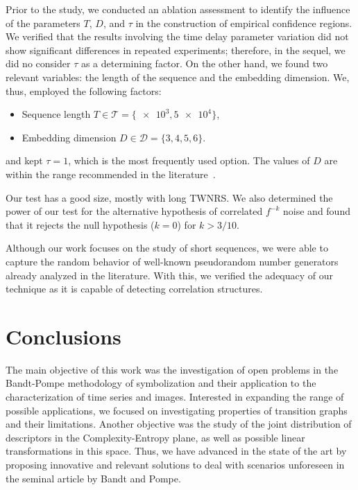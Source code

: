 \documentclass[a4,11pt]{pssbmac}
\begin{document}
Prior to the study, we conducted an ablation assessment to identify the influence of the parameters $T$, $D$, and $\tau$ in the construction of empirical confidence regions.
We verified that the results involving the time delay parameter variation did not show significant differences in repeated experiments; therefore, in the sequel, we did no consider $\tau$ as a determining factor.
On the other hand, we found two relevant variables: the length of the sequence and the embedding dimension.
We, thus, employed the following factors:
\begin{itemize}
	\item Sequence length $T\in\mathcal T=\{ \num[scientific-notation=true]{e3}, \num[scientific-notation=true]{5 e4}\}$,
	\item Embedding dimension $D\in\mathcal D=\{3, 4, 5, 6\}$.
\end{itemize}
and kept $\tau=1$, which is the most frequently used option.
The values of $D$ are within the range recommended in the literature~\cite{PermutationEntropyBandtPompe}.

Our test has a good size, mostly with long TWNRS.
We also determined the power of our test for the alternative hypothesis of correlated $f^{-k}$ noise and found that it rejects the null hypothesis ($k=0$) for $k>3/10$.

Although our work focuses on the study of short sequences, we were able to capture the random behavior of well-known pseudorandom number generators already analyzed in the literature. 
With this, we verified the adequacy of our technique as it is capable of detecting correlation structures.

\section{Conclusions} 

The main objective of this work was the investigation of open problems in the Bandt-Pompe methodology of symbolization and their application to the characterization of time series and images.
Interested in expanding the range of possible applications, we focused on investigating properties of transition graphs and their limitations.
Another objective was the study of the joint distribution of descriptors in the Complexity-Entropy plane, as well as possible linear transformations in this space.
Thus, we have advanced in the state of the art by proposing innovative and relevant solutions to deal with scenarios unforeseen in the seminal article by Bandt and Pompe. 
\end{document}
